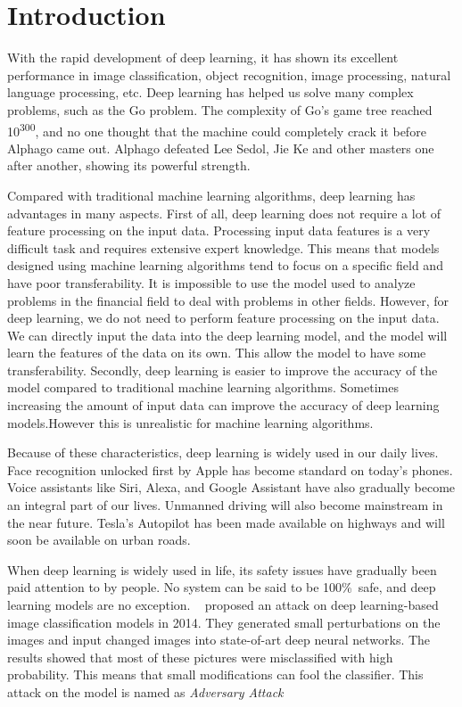 \documentclass{article}
\begin{document}
\section{Introduction}
With the rapid development of deep learning, it has shown its excellent performance in image classification, object recognition, image processing, natural language processing, etc. Deep learning has helped us solve many complex problems, such as the Go problem. The complexity of Go's game tree reached 10\textsuperscript{300}, and no one thought that the machine could completely crack it before Alphago came out. Alphago defeated Lee Sedol, Jie Ke and other masters one after another, showing its powerful strength.

Compared with traditional machine learning algorithms, deep learning has advantages in many aspects. First of all, deep learning does not require a lot of feature processing on the input data. Processing input data features is a very difficult task and requires extensive expert knowledge. This means that models designed using machine learning algorithms tend to focus on a specific field and have poor transferability. It is impossible to use the model used to analyze problems in the financial field to deal with problems in other fields. However, for deep learning, we do not need to perform feature processing on the input data. We can directly input the data into the deep learning model, and the model will learn the features of the data on its own. This allow the model to have some transferability. Secondly, deep learning is easier to improve the accuracy of the model compared to traditional machine learning algorithms. Sometimes increasing the amount of input data can improve the accuracy of deep learning models.However this is unrealistic for machine learning algorithms.

Because of these characteristics, deep learning is widely used in our daily lives. Face recognition unlocked first by Apple has become standard on today's phones. Voice assistants like Siri, Alexa, and Google Assistant have also gradually become an integral part of our lives. Unmanned driving will also become mainstream in the near future. Tesla's Autopilot has been made available on highways and will soon be available on urban roads.

When deep learning is widely used in life, its safety issues have gradually been paid attention to by people. No system can be said to be 100\%\ safe, and deep learning models are no exception. ~\cite{Szegedy42503}  proposed an attack on deep learning-based image classification models in 2014. They generated small perturbations on the images and input changed images into state-of-art deep neural networks. The results showed that most of these pictures were misclassified with high probability. This means that small modifications can fool the classifier. This attack on the model is named as \textit{Adversary Attack}
\end{document}
